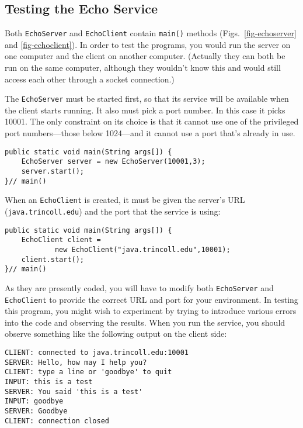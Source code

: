 \subsection*{Testing the Echo Service}
\noindent Both {\tt EchoServer} and {\tt EchoClient} contain {\tt main()}
methods (Figs.~\ref{fig-echoserver} and \ref{fig-echoclient}). In
order to test the programs, you would run the server on one computer
and the client on another computer.  (Actually they can both be run on the
same computer, although they wouldn't know this and would still access
each other through a socket connection.)



The {\tt EchoServer} must be started first, so that its service will
be available when the client starts running.  It also must pick a port
number.   In this case it picks 10001. The only constraint on its
choice is that it cannot use one of the privileged port numbers---those 
below 1024---and it cannot use a port that's already in use.

\begin{jjjlisting}
\begin{lstlisting}
public static void main(String args[]) {
    EchoServer server = new EchoServer(10001,3);
    server.start();
}// main()
\end{lstlisting}
\end{jjjlisting}

\noindent When an {\tt EchoClient} is created, it must be given the server's
URL ({\tt java.\-trincoll.edu}) and the port that the service is using:

\begin{jjjlisting}
\begin{lstlisting}
public static void main(String args[]) {
    EchoClient client = 
            new EchoClient("java.trincoll.edu",10001);
    client.start();
}// main()
\end{lstlisting}
\end{jjjlisting}

\noindent As they are presently coded, you will have to modify both
{\tt EchoServer} and {\tt EchoClient} to provide the correct URL and port
for your environment.  In testing this program, you might wish to
experiment by trying to introduce various errors into the code and
observing the results.  When you run the service, you should observe
something like the following output on the client side:

\begin{jjjlisting}
\begin{lstlisting}
CLIENT: connected to java.trincoll.edu:10001
SERVER: Hello, how may I help you?
CLIENT: type a line or 'goodbye' to quit
INPUT: this is a test
SERVER: You said 'this is a test'
INPUT: goodbye
SERVER: Goodbye
CLIENT: connection closed
\end{lstlisting}
\end{jjjlisting}

